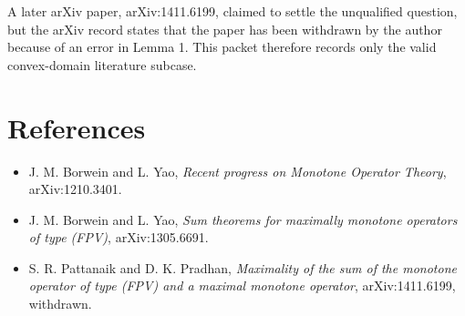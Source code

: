 \documentclass[11pt]{article}
\begin{document}
A later arXiv paper, arXiv:1411.6199, claimed to settle the unqualified
question, but the arXiv record states that the paper has been withdrawn by the
author because of an error in Lemma 1.  This packet therefore records only the
valid convex-domain literature subcase.

\section{References}

\begin{itemize}[leftmargin=*]
\item J. M. Borwein and L. Yao, \emph{Recent progress on Monotone Operator
Theory}, arXiv:1210.3401.
\item J. M. Borwein and L. Yao, \emph{Sum theorems for maximally monotone
operators of type (FPV)}, arXiv:1305.6691.
\item S. R. Pattanaik and D. K. Pradhan, \emph{Maximality of the sum of the
monotone operator of type (FPV) and a maximal monotone operator},
arXiv:1411.6199, withdrawn.
\end{itemize}
\end{document}
